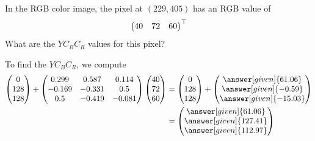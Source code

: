 \documentclass{ximera}
\begin{document}
\begin{example}
    In the RGB color image, the pixel at $(229,405)$ has an RGB value of
    \[
    \begin{pmatrix} 40 & 72 & 60 \end{pmatrix}^\top
    \]
    What are the $YC_BC_R$ values for this pixel?
    \begin{explanation}
      To find the  $YC_BC_R$, we compute
      \begin{align*}
      \begin{pmatrix}
        0\\
        128\\
        128
  \end{pmatrix}+\begin{pmatrix}
          0.299  &  0.587  &  0.114 \\
          -0.169 & -0.331 &  0.5 \\
          0.5   & -0.419 & -0.081
        \end{pmatrix} \begin{pmatrix} 40 \\ 72 \\ 60 \end{pmatrix}
        &=
         \begin{pmatrix}
        0\\
        128\\
        128
         \end{pmatrix}+\begin{pmatrix} \answer[given]{61.06} \\ \answer[given]{-0.59} \\ \answer[given]{-15.03} \end{pmatrix}\\
         &= \begin{pmatrix} \answer[given]{61.06} \\ \answer[given]{127.41} \\ \answer[given]{112.97} \end{pmatrix}
        \end{align*}
    \end{explanation}
\end{example}
\end{document}
